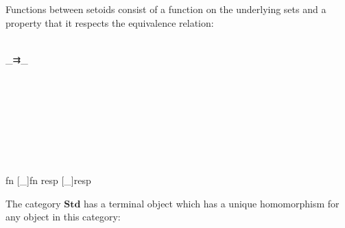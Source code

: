 Functions between setoids consist of a function on the underlying sets and a property that it respects the equivalence relation:

\begin{code}\>\<%
\\
\>  \_⇉\_\<%
\\
%
\\
\>  \AgdaSymbol{(}  \AgdaSymbol{:} \AgdaSymbol{)} \AgdaSymbol{:}  \<%
\\
\>[-1]\<[2]%
\>[2] \<%
\\
\>[0]\<[2]%
\>[2]\<%
\\
\>[2]\<[4]%
\>[4] \<[9]%
\>[9]\AgdaSymbol{:}       \<%
\\
\>[2]\<[4]%
\>[4] \AgdaSymbol{:} \AgdaSymbol{\{}  \AgdaSymbol{:}   \AgdaSymbol{\}}  \<[28]%
\>[28]\<%
\\
\>[4]\<[11]%
\>[11]\AgdaSymbol{(}\AgdaFunction{[}  \AgdaFunction{]}   \AgdaSymbol{)}  \<[27]%
\>[27]\<%
\\
\>[4]\<[11]%
\>[11]\AgdaFunction{[}  \AgdaFunction{]}     \<%
\\
\>    \AgdaSymbol{(}fn  [\_]fn \AgdaSymbol{;} resp  [\_]resp\AgdaSymbol{)}\<%
\\
\>\<\end{code}

The category $\textbf{Std}$ has a terminal object which has a unique homomorphism for any object in this category:


